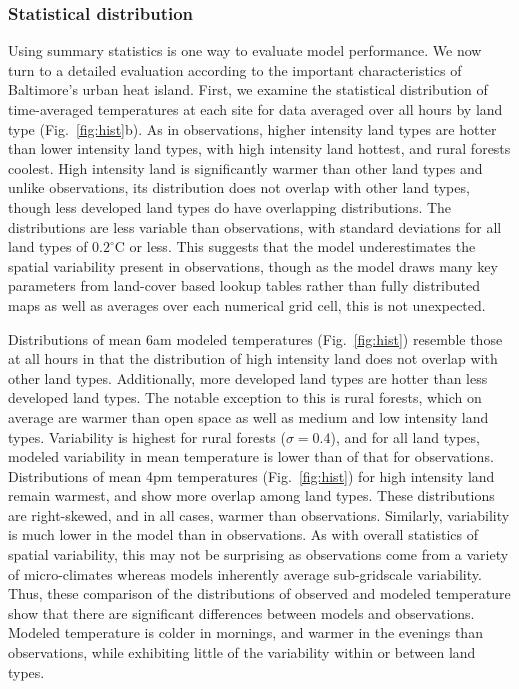 \subsubsection{Statistical distribution}
Using summary statistics is one way to evaluate model performance. %
We now turn to a detailed evaluation according to the important characteristics of Baltimore's urban heat island. 
First, we examine the statistical distribution of time-averaged temperatures at each site for data averaged over all hours by land type (Fig.~\ref{fig:hist}b). 
As in observations, higher intensity land types are hotter than lower intensity land types, with high intensity land hottest, and rural forests coolest. High intensity land is significantly warmer than other land types and unlike observations, its distribution does not overlap with other land types, though less developed land types do have overlapping distributions. 
The distributions are less variable than observations, with standard deviations for all land types of $0.2^\circ$C or less. This suggests that the model underestimates the spatial variability present in observations, though as the model draws many key parameters from land-cover based lookup tables rather than fully distributed maps as well as averages over each numerical grid cell, this is not unexpected. 

Distributions of mean 6am modeled temperatures (Fig.~\ref{fig:hist}) resemble those at all hours in that the distribution of high intensity land does not overlap with other land types. Additionally, more developed land types are hotter than less developed land types. The notable exception to this is rural forests, which on average are warmer than open space as well as medium and low intensity land types. Variability is highest for rural forests ($\sigma = 0.4$), and for all land types, modeled variability in mean temperature is lower than of that for observations. Distributions of mean 4pm temperatures (Fig.~\ref{fig:hist}) for high intensity land remain warmest, and show more overlap among land types. These distributions are right-skewed, and in all cases, warmer than observations. Similarly, variability is much lower in the model than in observations. As with overall statistics of spatial variability, this may not be surprising as observations come from a variety of micro-climates whereas models inherently average sub-gridscale variability. Thus, these comparison of the distributions of observed and modeled temperature show that there are significant differences between models and observations. Modeled temperature is colder in mornings, and warmer in the evenings than observations, while exhibiting little of the variability within or between land types. 

